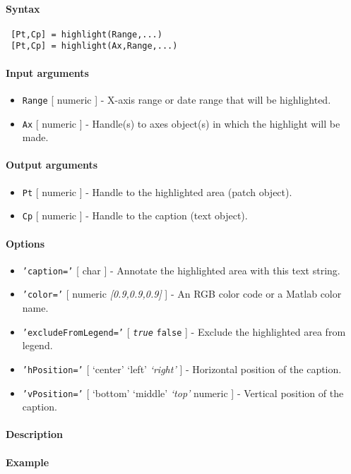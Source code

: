 


	\paragraph{Syntax}
 
 \begin{verbatim}
 [Pt,Cp] = highlight(Range,...)
 [Pt,Cp] = highlight(Ax,Range,...)
 \end{verbatim}
 
 \paragraph{Input arguments}
 
 \begin{itemize}
 \item
   \texttt{Range} {[} numeric {]} - X-axis range or date range that will
   be highlighted.
 \item
   \texttt{Ax} {[} numeric {]} - Handle(s) to axes object(s) in which the
   highlight will be made.
 \end{itemize}
 
 \paragraph{Output arguments}
 
 \begin{itemize}
 \item
   \texttt{Pt} {[} numeric {]} - Handle to the highlighted area (patch
   object).
 \item
   \texttt{Cp} {[} numeric {]} - Handle to the caption (text object).
 \end{itemize}
 
 \paragraph{Options}
 
 \begin{itemize}
 \item
   \texttt{'caption='} {[} char {]} - Annotate the highlighted area with
   this text string.
 \item
   \texttt{'color='} {[} numeric \textbar{} \emph{{[}0.9,0.9,0.9{]}} {]}
   - An RGB color code or a Matlab color name.
 \item
   \texttt{'excludeFromLegend='} {[} \emph{\texttt{true}} \textbar{}
   \texttt{false} {]} - Exclude the highlighted area from legend.
 \item
   \texttt{'hPosition='} {[} `center' \textbar{} `left' \textbar{}
   \emph{`right'} {]} - Horizontal position of the caption.
 \item
   \texttt{'vPosition='} {[} `bottom' \textbar{} `middle' \textbar{}
   \emph{`top'} \textbar{} numeric {]} - Vertical position of the
   caption.
 \end{itemize}
 
 \paragraph{Description}
 
 \paragraph{Example}


